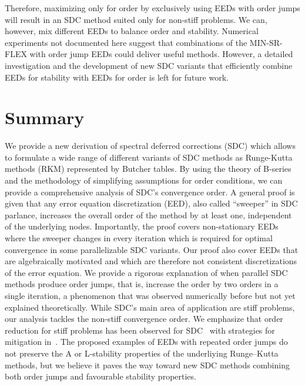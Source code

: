 \documentclass[sn-mathphys-num]{sn-jnl}%
\newcommand{\reva}[1]{#1}%
\newcommand{\revb}[1]{#1}%
\theoremstyle{thmstyleone}%
\theoremstyle{thmstyletwo}%
\theoremstyle{thmstylethree}%
\begin{document}
\reva{Therefore, maximizing only for order by exclusively using EEDs with order jumps will result in an SDC method suited only for non-stiff problems.  
We can, however, mix different EEDs to balance order and stability. 
Numerical experiments not documented here suggest that combinations of the MIN-SR-FLEX with order jump EEDs could deliver useful methods.
However, a detailed investigation and the development of new SDC variants that efficiently combine EEDs for stability with EEDs for order is left for future work.
}



%
\section{Summary}\label{sec:conclusions}

We provide a new derivation of spectral deferred corrections (SDC) which allows to formulate a wide range of different variants of SDC methods as Runge-Kutta methods (RKM) represented by Butcher tables. 
By using the theory of B-series and the methodology of simplifying assumptions for order conditions, we can provide a comprehensive analysis of SDC's convergence order.
A general proof is given that any error equation discretization (EED),  also called ``sweeper'' in SDC parlance, increases the overall order of the method by at least one, independent of the underlying nodes.
Importantly, the proof covers non-stationary EEDs where the sweeper changes in every iteration which is required for optimal convergence in some parallelizable SDC variants.
Our proof also cover EEDs that are algebraically motivated and which are therefore not consistent discretizations of the error equation.
We provide a rigorous explanation of when parallel SDC methods produce order jumps, that is, increase the order by two orders in a single iteration, a phenomenon that was observed numerically before but not yet explained theoretically.
\revb{While SDC's main area of application are stiff problems, our analysis tackles the non-stiff convergence order. We emphasize that order reduction for stiff problems has been observed for SDC~\cite{CaklovicEtAl2025} with strategies for mitigation in~\cite{Weiser2014,HuangEtAl2006}.
    The proposed examples of EEDs with repeated order jumps do not preserve the A or L-stability properties of the underliying Runge--Kutta methods, but we believe it paves the way toward new SDC methods combining both order jumps and favourable stability properties.}
\end{document}
